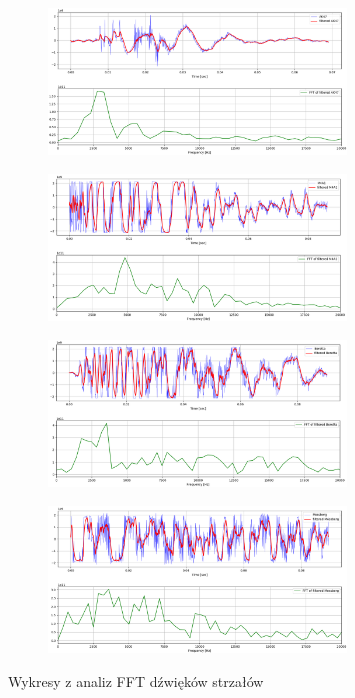 \begin{figure}[H]
	\centering
	\begin{subfigure}{.49\textwidth}
		\centering
		\includegraphics[height=3.9cm]{wykresy/AK47_fft.png}
	\end{subfigure}
	\begin{subfigure}{.49\textwidth}
		\centering
		\includegraphics[height=3.9cm]{wykresy/M4A1_fft.png}
	\end{subfigure}
	\begin{subfigure}{.49\textwidth}
		\centering
		\includegraphics[height=3.9cm]{wykresy/Beretta_fft.png}
	\end{subfigure}
	\begin{subfigure}{.49\textwidth}
		\centering
		\includegraphics[height=3.9cm]{wykresy/Mossberg_fft.png}
	\end{subfigure}
	\caption{\label{pic:wykresy_FFt} Wykresy z analiz FFT dźwięków strzałów}
\end{figure}

